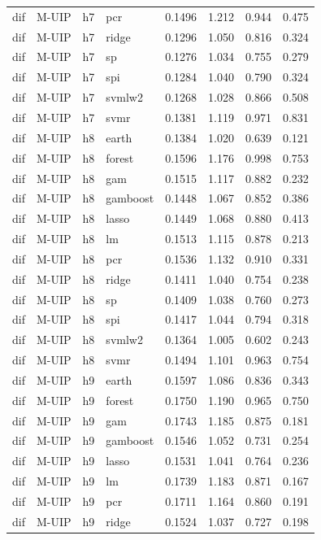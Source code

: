 \begin{ThreePartTable}
\begin{longtable}[t]{llclcccc}
dif & M-UIP & h7 & pcr & 0.1496 & 1.212 & 0.944 & 0.475\\
dif & M-UIP & h7 & ridge & 0.1296 & 1.050 & 0.816 & 0.324\\
dif & M-UIP & h7 & sp & 0.1276 & 1.034 & 0.755 & 0.279\\
dif & M-UIP & h7 & spi & 0.1284 & 1.040 & 0.790 & 0.324\\
dif & M-UIP & h7 & svmlw2 & 0.1268 & 1.028 & 0.866 & 0.508\\
dif & M-UIP & h7 & svmr & 0.1381 & 1.119 & 0.971 & 0.831\\
\addlinespace
dif & M-UIP & h8 & earth & 0.1384 & 1.020 & 0.639 & 0.121\\
dif & M-UIP & h8 & forest & 0.1596 & 1.176 & 0.998 & 0.753\\
dif & M-UIP & h8 & gam & 0.1515 & 1.117 & 0.882 & 0.232\\
dif & M-UIP & h8 & gamboost & 0.1448 & 1.067 & 0.852 & 0.386\\
dif & M-UIP & h8 & lasso & 0.1449 & 1.068 & 0.880 & 0.413\\
dif & M-UIP & h8 & lm & 0.1513 & 1.115 & 0.878 & 0.213\\
dif & M-UIP & h8 & pcr & 0.1536 & 1.132 & 0.910 & 0.331\\
dif & M-UIP & h8 & ridge & 0.1411 & 1.040 & 0.754 & 0.238\\
dif & M-UIP & h8 & sp & 0.1409 & 1.038 & 0.760 & 0.273\\
dif & M-UIP & h8 & spi & 0.1417 & 1.044 & 0.794 & 0.318\\
dif & M-UIP & h8 & svmlw2 & 0.1364 & 1.005 & 0.602 & 0.243\\
dif & M-UIP & h8 & svmr & 0.1494 & 1.101 & 0.963 & 0.754\\
\addlinespace
dif & M-UIP & h9 & earth & 0.1597 & 1.086 & 0.836 & 0.343\\
dif & M-UIP & h9 & forest & 0.1750 & 1.190 & 0.965 & 0.750\\
dif & M-UIP & h9 & gam & 0.1743 & 1.185 & 0.875 & 0.181\\
dif & M-UIP & h9 & gamboost & 0.1546 & 1.052 & 0.731 & 0.254\\
dif & M-UIP & h9 & lasso & 0.1531 & 1.041 & 0.764 & 0.236\\
dif & M-UIP & h9 & lm & 0.1739 & 1.183 & 0.871 & 0.167\\
dif & M-UIP & h9 & pcr & 0.1711 & 1.164 & 0.860 & 0.191\\
dif & M-UIP & h9 & ridge & 0.1524 & 1.037 & 0.727 & 0.198\\

\end{longtable}
\end{ThreePartTable}
